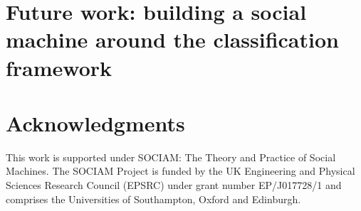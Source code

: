 \documentclass{sig-alternate}
\begin{document}
\section{Future work: building a social machine around the classification framework}

\section{Acknowledgments}

This work is supported under SOCIAM: The Theory and Practice of Social Machines.  The SOCIAM Project is funded by the UK Engineering and Physical Sciences Research Council (EPSRC) under grant number EP/J017728/1 and comprises the Universities of Southampton, Oxford and Edinburgh.

%

%
%


\balancecolumns %
\end{document}
